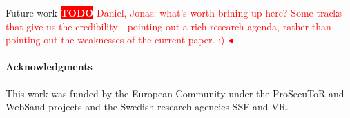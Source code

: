 \documentclass{llncs}
\newcommand{\todo}[1]{\colorbox{red}{\textcolor{white}{\sffamily\bfseries\scriptsize TODO}} \textcolor{red}{#1} \textcolor{red}{$\blacktriangleleft$}}
\begin{document}
Future work \todo{Daniel, Jonas: what's worth brining up here? Some
tracks that give us the credibility - pointing out a rich research agenda, rather
than pointing out the weaknesses of the current paper. :) }

\paragraph{Acknowledgments}
This work was funded by 
the European Community under the ProSecuToR and WebSand projects
and
the Swedish research agencies SSF and VR.




\end{document}
